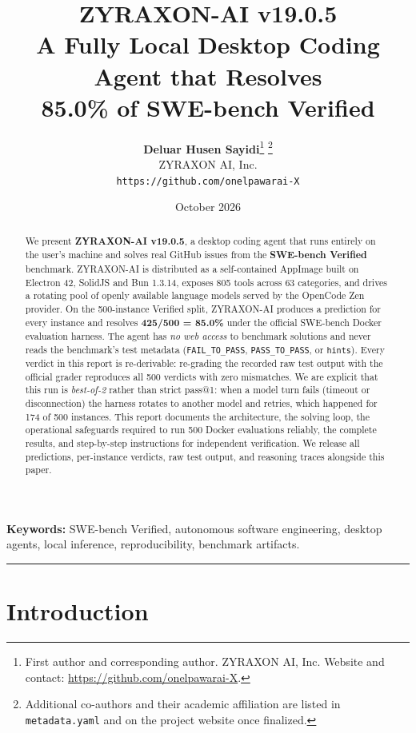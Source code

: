 \documentclass[11pt,a4paper]{article}
\title{\vspace{-2.2cm}\textbf{\color{zyink}ZYRAXON-AI v19.0.5}\\[0.3em]
\Large A Fully Local Desktop Coding Agent that Resolves\\[0.15em]
\textbf{85.0\%} of SWE-bench Verified}
\author{%
  \textbf{Deluar Husen Sayidi}\thanks{First author and corresponding author. ZYRAXON AI, Inc. Website and contact: \url{https://github.com/onelpawarai-X}.}%
  \thanks{Additional co-authors and their academic affiliation are listed in \texttt{metadata.yaml} and on the project website once finalized.}\\
  ZYRAXON AI, Inc.\\
  \texttt{https://github.com/onelpawarai-X}%
}
\date{October 2026}
\begin{document}
\maketitle
\thispagestyle{fancy}

\begin{abstract}
\noindent
We present \textbf{ZYRAXON-AI v19.0.5}, a desktop coding agent that runs entirely
on the user's machine and solves real GitHub issues from the
\textbf{SWE-bench Verified} benchmark. ZYRAXON-AI is distributed as a self-contained
AppImage built on Electron 42, SolidJS and Bun 1.3.14, exposes 805 tools across 63
categories, and drives a rotating pool of openly available language models served by
the OpenCode Zen provider. On the 500-instance Verified split, ZYRAXON-AI produces a
prediction for every instance and resolves \textbf{425/500 = 85.0\%} under the official
SWE-bench Docker evaluation harness. The agent has \emph{no web access} to benchmark
solutions and never reads the benchmark's test metadata
(\texttt{FAIL\_TO\_PASS}, \texttt{PASS\_TO\_PASS}, or \texttt{hints}). Every verdict in
this report is re-derivable: re-grading the recorded raw test output with the official
grader reproduces all 500 verdicts with zero mismatches. We are explicit that this run
is \emph{best-of-2} rather than strict pass@1: when a model turn fails (timeout or
disconnection) the harness rotates to another model and retries, which happened for 174
of 500 instances. This report documents the architecture, the solving loop, the
operational safeguards required to run 500 Docker evaluations reliably, the complete
results, and step-by-step instructions for independent verification. We release all
predictions, per-instance verdicts, raw test output, and reasoning traces alongside
this paper.
\end{abstract}

\vspace{0.5em}
\noindent\textbf{Keywords:} SWE-bench Verified, autonomous software engineering,
desktop agents, local inference, reproducibility, benchmark artifacts.

\vspace{1em}
\hrule
\vspace{1em}

\tableofcontents
\newpage

\section{Introduction}
\end{document}

